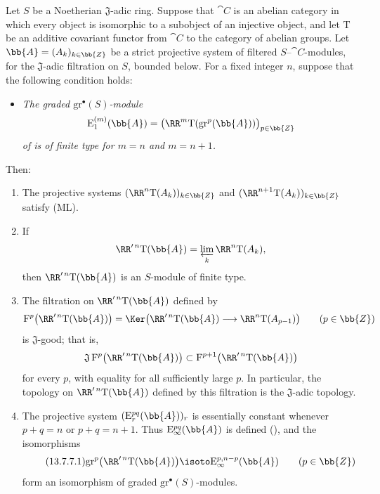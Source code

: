 \begin{proposition}[13.7.7]
\label{0.13.7.7}
Let $S$ be a Noetherian $\mathfrak{J}$-adic ring.
Suppose that $\cat{C}$ is an abelian category in which every object
is isomorphic to a subobject of an injective object, and let
$\mathrm{T}$ be an additive covariant functor from $\cat{C}$ to the
category of abelian groups.
Let $\bb{A}=(A_k)_{k\in\bb{Z}}$ be a strict projective system of
filtered $S$--$\cat{C}$-modules, for the $\mathfrak{J}$-adic
filtration on $S$, bounded below.
For a fixed integer $n$, suppose that the following condition holds:
\begin{itemize}
  \item[$(\mathrm{F}_n)$]
  \emph{The graded $\mathrm{gr}^\bullet(S)$-module}
  \[
    \mathrm{E}_1^{(m)}(\bb{A})
    =
    \bigl(
      \RR^m\mathrm{T}(\mathrm{gr}^p(\bb{A}))
    \bigr)_{p\in\bb{Z}}
  \]
  \emph{of  is of finite type for
  $m=n$ and $m=n+1$.}
\end{itemize}
Then:
\begin{enumerate}
  \item[{\rm(i)}] The projective systems
  $(\RR^n\mathrm{T}(A_k))_{k\in\bb{Z}}$ and
  $(\RR^{n+1}\mathrm{T}(A_k))_{k\in\bb{Z}}$ satisfy {\rm(ML)}.
  \item[{\rm(ii)}] If
  \[
    \RR'^{\,n}\mathrm{T}(\bb{A})
    =
    \varprojlim_k\RR^n\mathrm{T}(A_k),
  \]
  then $\RR'^{\,n}\mathrm{T}(\bb{A})$ is an $S$-module of finite
  type.
  \item[{\rm(iii)}] The filtration on
  $\RR'^{\,n}\mathrm{T}(\bb{A})$ defined by
  \[
    \mathrm{F}^p\bigl(\RR'^{\,n}\mathrm{T}(\bb{A})\bigr)
    =
    \Ker\bigl(
      \RR'^{\,n}\mathrm{T}(\bb{A})
      \longrightarrow
      \RR^n\mathrm{T}(A_{p-1})
    \bigr)
    \qquad(p\in\bb{Z})
  \]
  is $\mathfrak{J}$-good; that is,
  \[
    \mathfrak{J}\,
    \mathrm{F}^p\bigl(\RR'^{\,n}\mathrm{T}(\bb{A})\bigr)
    \subset
    \mathrm{F}^{p+1}\bigl(\RR'^{\,n}\mathrm{T}(\bb{A})\bigr)
  \]
  for every $p$, with equality for all sufficiently large $p$.
  In particular, the topology on
  $\RR'^{\,n}\mathrm{T}(\bb{A})$ defined by this filtration is the
  $\mathfrak{J}$-adic topology.
  \item[{\rm(iv)}] The projective system
  $(\mathrm{E}_r^{pq}(\bb{A}))_r$ is essentially constant whenever
  $p+q=n$ or $p+q=n+1$.
  Thus $\mathrm{E}_\infty^{pq}(\bb{A})$ is defined
  (), and the isomorphisms
  \begin{equation}
  \label{0.13.7.7.1}
  \tag{13.7.7.1}
    \mathrm{gr}^p\bigl(\RR'^{\,n}\mathrm{T}(\bb{A})\bigr)
    \isoto
    \mathrm{E}_\infty^{p,n-p}(\bb{A})
    \qquad(p\in\bb{Z})
  \end{equation}
  form an isomorphism of graded
  $\mathrm{gr}^\bullet(S)$-modules.
\end{enumerate}
\end{proposition}

